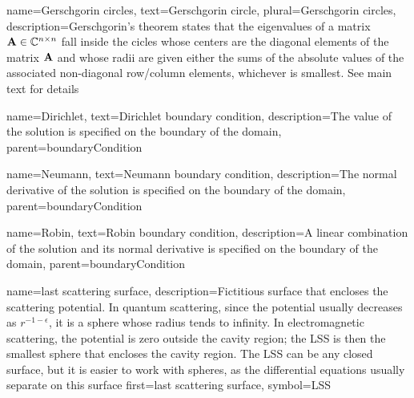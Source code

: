%
{%
  name={Gerschgorin circles},
  text={Gerschgorin circle},
  plural={Gerschgorin circles},
  description={Gerschgorin's theorem states that the eigenvalues of a matrix $\mathbf{A}\in\mathbb{C}^{n\times n}$ %
		fall inside the cicles whose centers are the diagonal elements of the matrix $\mathbf{A}$ and whose
		radii are given either the sums of the absolute values of the associated non-diagonal row/column elements,
		whichever is smallest. See main text for details}
}


%
{%
	name={Dirichlet},
	text={Dirichlet boundary condition},
	description={The value of the solution is specified on the boundary of the domain},
	parent={boundaryCondition}
}

%
{%
	name={Neumann},
	text={Neumann boundary condition},
	description={The normal derivative of the solution is specified on the boundary of the domain},
	parent={boundaryCondition}
}

%
{%
	name={Robin}, 
	text={Robin boundary condition},
	description={A linear combination of the solution and its normal derivative is specified on the boundary of the domain},
	parent={boundaryCondition}
}

{
	name={last scattering surface},
	description={Fictitious surface that encloses the scattering potential. In quantum scattering,
					since the potential usually decreases as $r^{-1-\epsilon}$, it is a
					sphere whose radius tends to infinity. In electromagnetic scattering, 
					the potential is zero outside the cavity region; the LSS is then 
					the smallest sphere that encloses the cavity region. The LSS can be 
					any closed surface, but it is easier to work with spheres, as the differential
					equations usually separate on this surface}
	first={last scattering surface},
	symbol={LSS} 
}
  